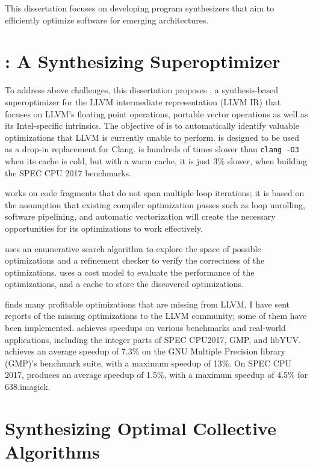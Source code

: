 This dissertation focuses on developing program synthesizers that aim
to efficiently optimize software for emerging architectures.


\section{\minotaur: A Synthesizing Superoptimizer}

To address above challenges, this dissertation proposes \minotaur{}, a
synthesis-based superoptimizer for the LLVM intermediate
representation (LLVM IR) that focuses on LLVM's floating point
operations, portable vector operations as well as its Intel-specific
intrinsics.
%
The objective of \minotaur{} is to automatically identify valuable
optimizations that LLVM is currently unable to perform.
\minotaur{} is designed to be used as a drop-in replacement for Clang.
\minotaur{} is hundreds of times slower than \texttt{clang -O3} when its
cache is cold, but with a warm cache, it is just 3\% slower, when
building the SPEC CPU 2017 benchmarks.

\minotaur{} works on code fragments that do not span multiple loop
iterations; it is based on the assumption that existing compiler
optimization passes such as loop unrolling, software pipelining, and
automatic vectorization will create the necessary opportunities for
its optimizations to work effectively.

\minotaur{} uses an enumerative search algorithm to explore the space of
possible optimizations and a refinement checker to verify the
correctness of the optimizations.
\minotaur{} uses a cost model to evaluate the performance of the
optimizations, and a cache to store the discovered optimizations.

\minotaur{} finds many profitable optimizations that are missing from
LLVM,
%
I have sent reports of the missing optimizations to the LLVM community;
some of them have been implemented.
%
\minotaur{} achieves speedups on various benchmarks and real-world
applications, including the integer parts of SPEC CPU2017, GMP, and
libYUV.
%
\minotaur{} achieves an average speedup of 7.3\% on the GNU Multiple
Precision library (GMP)'s benchmark suite, with a maximum speedup of
13\%. On SPEC CPU 2017, \minotaur{} produces an average speedup of 1.5\%,
with a maximum speedup of 4.5\% for 638.imagick.

\section{Synthesizing Optimal Collective Algorithms}

